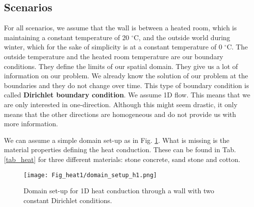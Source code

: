 \newpage
\subsection{Scenarios}

For all scenarios, we assume that the wall is between a heated room, which is maintaining a constant temperature of 20 $^{\circ}$C, and the outside world during winter, which for the sake of simplicity is at a constant temperature of 0 $^{\circ}$C.
The outside temperature and the heated room temperature are our boundary conditions. They define the limits of our spatial domain. They give us a lot of information on our problem. We already know the solution of our problem at the boundaries and they do not change over time. This type of boundary condition is called \textbf{Dirichlet boundary condition}. 
We assume 1D flow. This means that we are only interested in one-direction. Although this might seem drastic, it only means that the other directions are homogeneous and do not provide us with more information.

We can assume a simple domain set-up as in Fig. \ref{dsuh1}. What is missing is the material properties defining the heat conduction. These can be found in Tab. \ref{tab_heat} for three different materials: stone concrete, sand stone and cotton.

\begin{figure}[!h]
	\centering
	\texttt{[image: Fig\_heat1/domain\_setup\_h1.png]}
	\caption{\label{dsuh1} Domain set-up for 1D heat conduction through a wall with two constant Dirichlet conditions.}
\end{figure} 

\begin{table}[!h]\caption{\label{tab_heat}Material properties needed for scenarios.}
	\centering
{}
\end{table}



